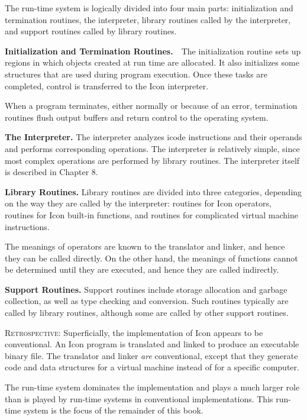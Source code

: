The run-time system is logically divided into four main parts:
initialization and termination routines, the interpreter, library
routines called by the interpreter, and support routines called by
library routines.


\textbf{Initialization and Termination Routines.}\ \ The
initialization routine sets up regions in which objects created at run
time are allocated. It also initializes some structures that are used
during program execution. Once these tasks are completed, control is
transferred to the Icon interpreter.

When a program terminates, either normally or because of an error,
termination routines flush output buffers and return control to the
operating system.

\textbf{The Interpreter.} The interpreter analyzes icode instructions
and their operands and performs corresponding operations. The
interpreter is relatively simple, since most complex operations are
performed by library routines. The interpreter itself is described in
Chapter 8.

\textbf{Library Routines. }Library routines are divided into three
categories, depending on the way they are called by the interpreter:
routines for Icon operators, routines for Icon built-in functions, and
routines for complicated virtual machine instructions.

The meanings of operators are known to the translator and linker, and
hence they can be called directly. On the other hand, the meanings of
functions cannot be determined until they are executed, and hence they
are called indirectly.

\textbf{Support Routines. }Support routines include storage allocation
and garbage collection, as well as type checking and conversion. Such
routines typically are called by library routines, although some are
called by other support routines.

\textsc{Retrospective}: Superficially, the implementation of Icon
appears to be conventional. An Icon program is translated and linked
to produce an executable binary file. The translator and linker
\textit{are }conventional, except that they generate code and data
structures for a virtual machine instead of for a specific computer.

The run-time system dominates the implementation and plays a much
larger role than is played by run-time systems in conventional
implementations. This run-time system is the focus of the remainder of
this book.

